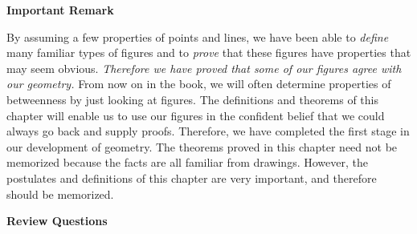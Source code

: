 \documentclass[11pt]{book}
\theoremstyle{bkplain}
\begin{document}
\begin{center}\bfseries Important Remark\end{center}

By assuming a few properties of points and lines, we have been able to
\emph{define} many familiar types of figures and to \emph{prove} that these
figures have properties that may seem obvious. \emph{Therefore we have proved
that some of our figures agree with our geometry.} From now on in the book, we
will often determine properties of betweenness by just looking at figures. The
definitions and theorems of this chapter will enable us to use our figures in the
confident belief that we could always go back and supply proofs. Therefore, we
have completed the first stage in our development of geometry. The theorems
proved in this chapter need not be memorized because the facts are all familiar
from drawings. However, the postulates and definitions of this chapter are very
important, and therefore should be memorized.

\begin{center}\bfseries Review Questions\end{center}
\end{document}
